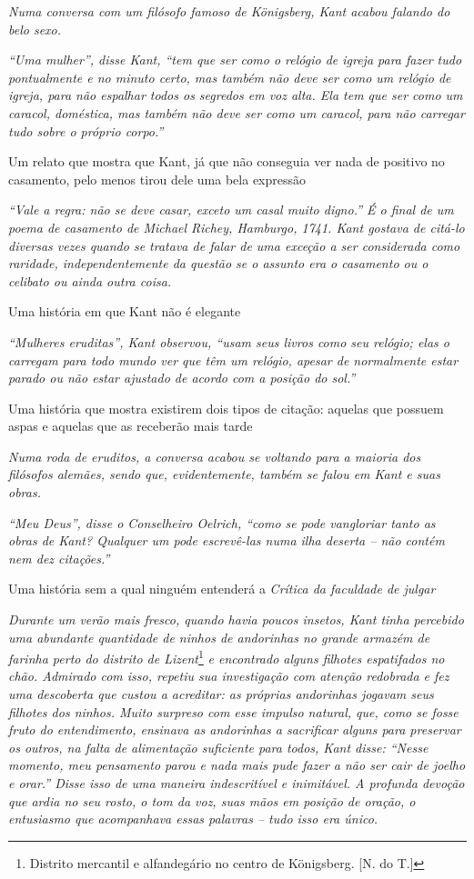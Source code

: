 \emph{Numa conversa com um filósofo famoso de Königsberg, Kant acabou
falando do belo sexo.}

\emph{``Uma mulher'', disse Kant, ``tem que ser como o relógio de igreja
para fazer tudo pontualmente e no minuto certo, mas também não deve ser
como um relógio de igreja, para não espalhar todos os segredos em voz
alta. Ela tem que ser como um caracol, doméstica, mas também não deve
ser como um caracol, para não carregar tudo sobre o próprio corpo.''}

Um relato que mostra que Kant, já que não conseguia ver nada de positivo
no casamento, pelo menos tirou dele uma bela expressão

\emph{``Vale a regra: não se deve casar, exceto um casal muito digno.''
É o final de um poema de casamento de Michael Richey, Hamburgo, 1741.
Kant gostava de citá-lo diversas vezes quando se tratava de falar de uma
exceção a ser considerada como raridade, independentemente da questão se
o assunto era o casamento ou o celibato ou ainda outra coisa.}

Uma história em que Kant não é elegante

\emph{``Mulheres eruditas'', Kant observou, ``usam seus livros como seu
relógio; elas o carregam para todo mundo ver que têm um relógio, apesar
de normalmente estar parado ou não estar ajustado de acordo com a
posição do sol.''}

Uma história que mostra existirem dois tipos de citação: aquelas que
possuem aspas e aquelas que as receberão mais tarde

\emph{Numa roda de eruditos, a conversa acabou se voltando para a
maioria dos filósofos alemães, sendo que, evidentemente, também se falou
em Kant e suas obras.}

\emph{``Meu Deus'', disse o Conselheiro Oelrich, ``como se pode
vangloriar tanto as obras de Kant? Qualquer um pode escrevê-las numa
ilha deserta -- não contém nem dez citações.''}

Uma história sem a qual ninguém entenderá a \emph{Crítica da faculdade
de julgar}

\emph{Durante um verão mais fresco, quando havia poucos insetos, Kant
tinha percebido uma abundante quantidade de ninhos de andorinhas no
grande armazém de farinha perto do distrito de Lizent}\footnote{Distrito
  mercantil e alfandegário no centro de Königsberg. {[}N. do T.{]}}
\emph{e encontrado alguns filhotes espatifados no chão. Admirado com
isso, repetiu sua investigação com atenção redobrada e fez uma
descoberta que custou a acreditar: as próprias andorinhas jogavam seus
filhotes dos ninhos. Muito surpreso com esse impulso natural, que, como
se fosse fruto do entendimento, ensinava as andorinhas a sacrificar
alguns para preservar os outros, na falta de alimentação suficiente para
todos, Kant disse: ``Nesse momento, meu pensamento parou e nada mais
pude fazer a não ser cair de joelho e orar.'' Disse isso de uma maneira
indescritível e inimitável. A profunda devoção que ardia no seu rosto, o
tom da voz, suas mãos em posição de oração, o entusiasmo que acompanhava
essas palavras -- tudo isso era único.}

